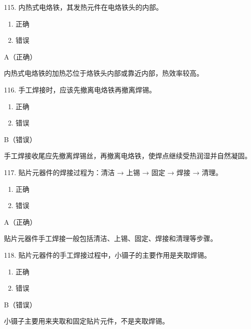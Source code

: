 \begin{question}{115. 内热式电烙铁，其发热元件在电烙铁头的内部。}
\begin{enumerate}[label=\Alph*., leftmargin=2.4em, itemsep=0.2em]
\item 正确
\item 错误
\end{enumerate}
\end{question}
\begin{answer}
A（正确）
\end{answer}
\begin{explanation}
内热式电烙铁的加热芯位于烙铁头内部或靠近内部，热效率较高。
\end{explanation}

\begin{question}{116. 手工焊接时，应该先撤离电烙铁再撤离焊锡。}
\begin{enumerate}[label=\Alph*., leftmargin=2.4em, itemsep=0.2em]
\item 正确
\item 错误
\end{enumerate}
\end{question}
\begin{answer}
B（错误）
\end{answer}
\begin{explanation}
手工焊接收尾应先撤离焊锡丝，再撤离电烙铁，使焊点继续受热润湿并自然凝固。
\end{explanation}

\begin{question}{117. 贴片元器件的焊接过程为：清洁 → 上锡 → 固定 → 焊接 → 清理。}
\begin{enumerate}[label=\Alph*., leftmargin=2.4em, itemsep=0.2em]
\item 正确
\item 错误
\end{enumerate}
\end{question}
\begin{answer}
A（正确）
\end{answer}
\begin{explanation}
贴片元器件手工焊接一般包括清洁、上锡、固定、焊接和清理等步骤。
\end{explanation}

\begin{question}{118. 贴片元器件的手工焊接过程中，小镊子的主要作用是夹取焊锡。}
\begin{enumerate}[label=\Alph*., leftmargin=2.4em, itemsep=0.2em]
\item 正确
\item 错误
\end{enumerate}
\end{question}
\begin{answer}
B（错误）
\end{answer}
\begin{explanation}
小镊子主要用来夹取和固定贴片元件，不是夹取焊锡。
\end{explanation}


